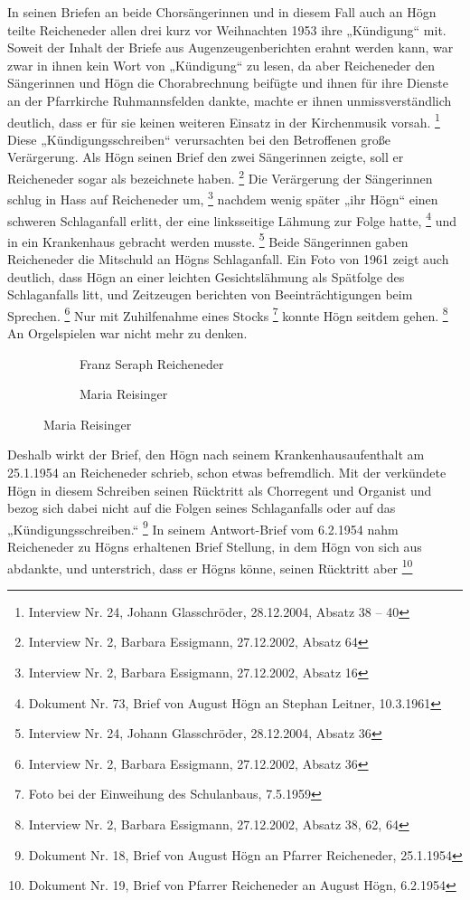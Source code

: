 In seinen Briefen an beide Chorsängerinnen und in diesem Fall auch an
Högn teilte Reicheneder allen drei kurz vor Weihnachten 1953 ihre
„Kündigung“ mit. Soweit der Inhalt der Briefe aus Augenzeugenberichten
erahnt werden kann, war zwar in ihnen kein Wort von „Kündigung“ zu
lesen, da aber Reicheneder den Sängerinnen und Högn die Chorabrechnung
beifügte und ihnen für ihre Dienste an der Pfarrkirche Ruhmannsfelden
dankte, machte er ihnen unmissverständlich deutlich, dass er für sie
keinen weiteren Einsatz in der Kirchenmusik vorsah. \footnote{Interview
Nr. 24, Johann Glasschröder, 28.12.2004, Absatz 38 – 40} Diese
„Kündigungsschreiben“ verursachten bei den Betroffenen große
Verärgerung. Als Högn seinen Brief den zwei Sängerinnen zeigte, soll er
Reicheneder sogar als  bezeichnete
haben. \footnote{Interview Nr. 2, Barbara Essigmann, 27.12.2002, Absatz
64} Die Verärgerung der Sängerinnen schlug in Hass auf Reicheneder
um, \footnote{Interview Nr. 2, Barbara Essigmann, 27.12.2002, Absatz
16} nachdem wenig später „ihr Högn“ einen schweren Schlaganfall erlitt,
der eine linksseitige Lähmung zur Folge hatte, \footnote{Dokument Nr.
73, Brief von August Högn an Stephan Leitner, 10.3.1961} und in ein
Krankenhaus gebracht werden musste. \footnote{Interview Nr. 24, Johann
Glasschröder, 28.12.2004, Absatz 36} Beide Sängerinnen gaben
Reicheneder die Mitschuld an Högns Schlaganfall. Ein Foto von 1961
zeigt auch deutlich, dass Högn an einer leichten Gesichtslähmung als
Spätfolge des Schlaganfalls litt, und Zeitzeugen berichten von
Beeinträchtigungen beim Sprechen. \footnote{Interview Nr. 2, Barbara
Essigmann, 27.12.2002, Absatz 36} Nur mit Zuhilfenahme eines
Stocks \footnote{Foto bei der Einweihung des Schulanbaus, 7.5.1959}
konnte Högn seitdem gehen. \footnote{Interview Nr. 2, Barbara
Essigmann, 27.12.2002, Absatz 38, 62, 64} An Orgelspielen war nicht
mehr zu denken.

\begin{figure}
\begin{subfigure}[b]{0.5\linewidth}
\caption{Franz Seraph Reicheneder}
\end{subfigure}
\begin{subfigure}[b]{0.5\linewidth}
\caption{Maria Reisinger}
\end{subfigure}
\end{figure}

Deshalb wirkt der Brief, den Högn nach seinem Krankenhausaufenthalt am
25.1.1954 an Reicheneder schrieb, schon etwas befremdlich. Mit der
 verkündete Högn in diesem Schreiben seinen
Rücktritt als Chorregent und Organist und bezog sich dabei nicht auf
die Folgen seines Schlaganfalls oder auf das „Kündigungsschreiben.“
 \footnote{Dokument Nr. 18, Brief von August Högn an Pfarrer
Reicheneder, 25.1.1954} In seinem Antwort-Brief vom 6.2.1954 nahm
Reicheneder zu Högns erhaltenen Brief Stellung, in dem Högn von sich
aus abdankte, und unterstrich, dass er Högns
 könne, seinen
Rücktritt aber  \footnote{Dokument
Nr. 19, Brief von Pfarrer Reicheneder an August Högn, 6.2.1954}

